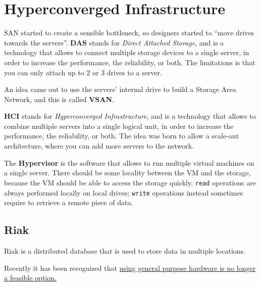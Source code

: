 \section{Hyperconverged Infrastructure}
SAN started to create a sensible bottleneck, so designers started to ``move drives towards the servers''.
\textbf{DAS} stands for \textit{Direct Attached Storage}, and is a technology that allows to connect multiple storage devices to a single server, in order to increase the performance, the reliability, or both.
The limitations is that you can only attach up to 2 or 3 drives to a server.

An idea came out to use the servers' internal drive to build a Storage Area Network, and this is called \textbf{VSAN}.

\textbf{HCI} stands for \textit{Hyperconverged Infrastructure}, and is a technology that allows to combine multiple servers into a single logical unit, in order to increase the performance, the reliability, or both. 
The idea was born to allow a scale-out architecture, where you can add more servers to the network.

The \textbf{Hypervisor} is the software that allows to run multiple virtual machines on a single server. There should be some locality between the VM and the storage, because the VM should be able to access the storage quickly.
\texttt{read} operations are always performed locally on local drives; \texttt{write} operations instead sometimes require to retrieve a remote piece of data.

\subsection{Riak}
Riak is a distributed database that is used to store data in multiple locations. 

Recently it has been recognized that \ul{using general purpose hardware is no longer a feasible option.}


